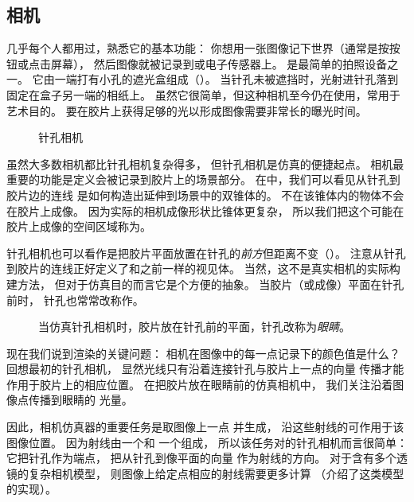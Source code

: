 \subsection{相机}\label{sub:相机}

几乎每个人都用过，熟悉它的基本功能：
你想用一张图像记下世界（通常是按按钮或点击屏幕），
然后图像就被记录到或电子传感器上。
是最简单的拍照设备之一。
它由一端打有小孔的遮光盒组成（）。
当针孔未被遮挡时，光射进针孔落到固定在盒子另一端的相纸上。
虽然它很简单，但这种相机至今仍在使用，常用于艺术目的。
要在胶片上获得足够的光以形成图像需要非常长的曝光时间。
\begin{figure}[htbp]
      \centering
      \caption{针孔相机}\label{fig:1.1}
\end{figure}

虽然大多数相机都比针孔相机复杂得多，
但针孔相机是仿真的便捷起点。
相机最重要的功能是定义会被记录到胶片上的场景部分。
在中，我们可以看见从针孔到胶片边的连线
是如何构造出延伸到场景中的双锥体的。
不在该锥体内的物体不会在胶片上成像。
因为实际的相机成像形状比锥体更复杂，
所以我们把这个可能在胶片上成像的空间区域称为。

针孔相机也可以看作是把胶片平面放置在针孔的\emph{前方}但距离不变（）。
注意从针孔到胶片的连线正好定义了和之前一样的视见体。
当然，这不是真实相机的实际构建方法，
但对于仿真目的而言它是个方便的抽象。
当胶片（或成像）平面在针孔前时，
针孔也常常改称作。
\begin{figure}[htbp]
      \centering
      \caption{当仿真针孔相机时，胶片放在针孔前的平面，针孔改称为\emph{眼睛}。}\label{fig:1.2}
\end{figure}

现在我们说到渲染的关键问题：
相机在图像中的每一点记录下的颜色值是什么？
回想最初的针孔相机，
显然光线只有沿着连接针孔与胶片上一点的向量
传播才能作用于胶片上的相应位置。
在把胶片放在眼睛前的仿真相机中，
我们关注沿着图像点传播到眼睛的
光量。

因此，相机仿真器的重要任务是取图像上一点
并生成，
沿这些射线的可作用于该图像位置。
因为射线由一个和
一个组成，
所以该任务对的针孔相机而言很简单：
它把针孔作为端点，
把从针孔到像平面的向量
作为射线的方向。
对于含有多个透镜的复杂相机模型，
则图像上给定点相应的射线需要更多计算
（介绍了这类模型的实现）。


